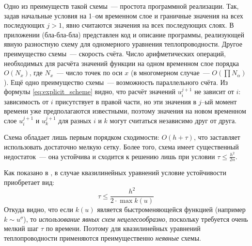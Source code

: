 Одно из преимуществ такой схемы~--- простота программной реализации.
Так, задав начальные условия на 1--ом временном слое и граничные значения на всех последующих $j > 1$, явно считаются значения на всех последующих слоях.
В приложении (бла-бла-бла) представлен код и описание программы, реализующей явную разностную схему для одномерного уравнения теплопроводности.
Другое преимущество схемы~--- скорость счёта.
Число арифметических операций, необходимых для расчёта значений функции на одном временном слое порядка $O(N_x)$, где $N_x$~--- число точек по оси $x$ (в многомерном случае~--- $O(\prod N_{\alpha})$).
Ещё одно преимущество схемы~--- возможность параллельного счёта.
Из формулы \eqref{eq:explicit_scheme} видно, что расчёт значений $u_i^{j + 1}$ не зависит от $i$: зависимость от $i$ присутствует в правой части, но эти значения в $j$--ый момент времени уже предполагаются известными, поэтому значения на новом временном слое $u_i^{j + 1}$ и $u_k^{j + 1}$ для разных $i$ и $k$ могут считаться независимо друг от друга.

Схема обладает лишь первым порядком сходимости: $O(h + \tau)$, что заставляет использовать достаточно мелкую сетку.
Более того, схема имеет существенный недостаток~--- она устойчива и сходится к решению лишь при условии
$
\tau \le \frac{h^2}{2n}
$.

Как показано в \cite{СамарскийТеорияРазностныхСхем}, в случае квазилинейных уравнений условие устойчивости приобретает вид:
\begin{equation*}
    \tau \le \frac{h^2 }{2 \cdot \max{k(u)}}
\end{equation*}
Откуда видно, что если $k(u)$ является быстроменяющейся функцией (например $k \sim u^\sigma$), то \emph{использование явных схем нецелесообразно}, поскольку требуется очень мелкий шаг $\tau$ по времени.
Поэтому для квазилинейных уравнений теплопроводности применяются преимущественно \emph{неявные} схемы.